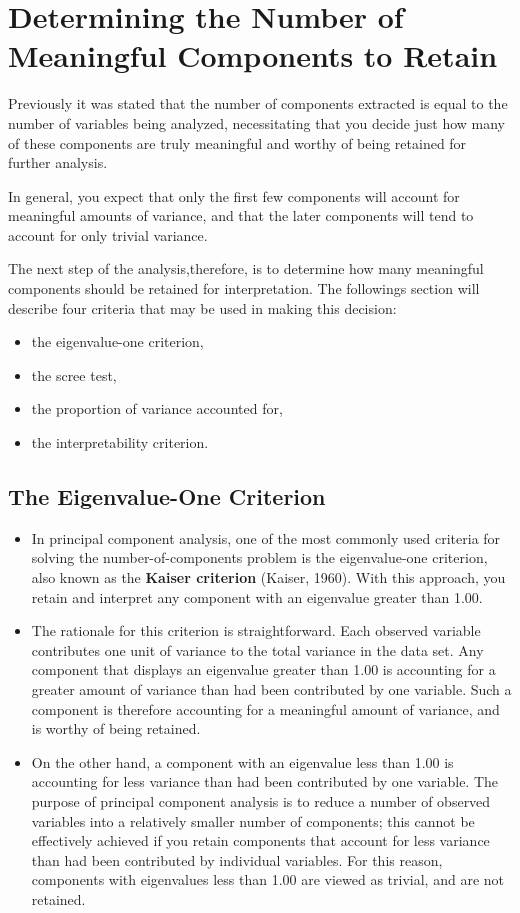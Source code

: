\documentclass[]{article}
\begin{document}
\section{Determining the Number of Meaningful Components to Retain}
Previously it was stated that the number of components extracted is equal to the number of variables
being analyzed, necessitating that you decide just how many of these components are truly
meaningful and worthy of being retained for further analysis.

In general, you expect
that only the first few components will account for meaningful amounts of variance, and that the
later components will tend to account for only trivial variance.

The next step of the analysis,therefore, is to determine how many meaningful components should be retained for
interpretation.  The followings section will describe four criteria that may be used in making this decision:
\begin{itemize} \item the eigenvalue-one criterion, \item the scree test, \item the proportion of variance accounted for, \item the
	interpretability criterion.
\end{itemize}


\subsection{The Eigenvalue-One Criterion}  
\begin{itemize}
\item In principal component analysis, one of the most commonly
used criteria for solving the number-of-components problem is the eigenvalue-one criterion, also
known as the \textbf{Kaiser criterion} (Kaiser, 1960).  With this approach, you retain and interpret any
component with an eigenvalue greater than 1.00.
\item
The rationale for this criterion is straightforward.  Each observed variable contributes one unit of
variance to the total variance in the data set.  Any component that displays an eigenvalue greater
than 1.00 is accounting  for a greater amount of variance than had been contributed by one
variable.  Such a component is therefore accounting for a meaningful amount of variance, and is
worthy of being retained.
\item
On the other hand, a component with an eigenvalue less than 1.00 is accounting for less variance
than had been contributed by one variable.  The purpose of principal component analysis is to
reduce a number of observed variables into a relatively smaller number of components; this
cannot be effectively achieved if you retain components that account for less variance than had
been contributed by individual variables.  For this reason, components with eigenvalues less than
1.00 are viewed as trivial, and are not retained.
\end{itemize}
\newpage
\end{document}
